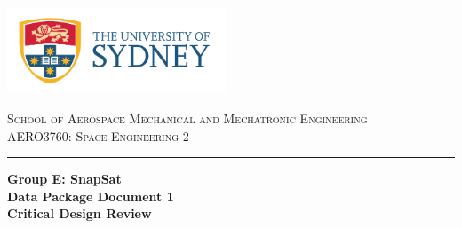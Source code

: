 \begin{titlepage}

\thispagestyle{empty}
\begin{center}
\begin{minipage}{\linewidth}
    \centering
    \includegraphics[width=6.5cm]{logo.png}
    \par
    \vspace{1.2cm}
    {\textsc{School of Aerospace Mechanical and Mechatronic Engineering \\ \vspace{0.3cm}
            AERO3760: Space Engineering 2}}
   \vspace{0.7cm}
	\hrule
    \vspace{1cm}
    {{\LARGE\bf{ Group E: SnapSat\\\vspace{0.4cm}Data Package Document 1 \\Critical Design Review }\par}}


\end{minipage}
\end{center}
\end{titlepage}
